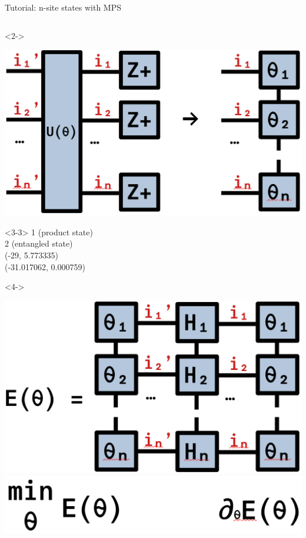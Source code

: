 \begin{frame}[fragile]{Tutorial: n-site states with MPS}
\begin{columns}
\begin{column}{4.5cm}
\begin{onlyenv}<2->
\vspace*{0.0cm}
\begin{center}
\includegraphics[width=\textwidth]{
  slides/assets/U_Zpn.png
}
\end{center}
\vspace*{0.0cm}
\end{onlyenv}

\begin{onlyenv}<3-3>
1 (product state) \\
2 (entangled state) \\
(-29, 5.773335) \\
(-31.017062, 0.000759)
\end{onlyenv}

\begin{onlyenv}<4->
\vspace*{0.0cm}
\begin{center}
\includegraphics[width=\textwidth]{
  slides/assets/thetan_H_thetan.png
} \\
\includegraphics[width=\textwidth]{
  slides/assets/min_grad_E_theta.png
}
\end{center}
\vspace*{0.0cm}
\end{onlyenv}


\end{column}
\end{columns}
\end{frame}
